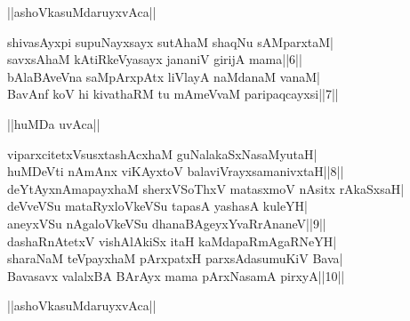 \documentclass{article}
\begin{document}
\begin{center}
||ashoVkasuMdaruyxvAca||
\end{center}

shivasAyxpi supuNayxsayx sutAhaM shaqNu sAMparxtaM|\\
savxsAhaM kAtiRkeVyasayx jananiV girijA mama||6||\\
bAlaBAveVna saMpArxpAtx liVlayA naMdanaM vanaM|\\
BavAnf koV hi kivathaRM tu mAmeVvaM paripaqcayxsi||7||\\

\begin{center}
||huMDa uvAca||
\end{center}

viparxcitetxVsusxtashAcxhaM guNalakaSxNasaMyutaH|\\
huMDeVti nAmAnx viKAyxtoV balaviVrayxsamanivxtaH||8||\\
deYtAyxnAmapayxhaM sherxVSoThxV matasxmoV nAsitx rAkaSxsaH|\\
deVveVSu mataRyxloVkeVSu tapasA yashasA kuleYH|\\
aneyxVSu nAgaloVkeVSu dhanaBAgeyxYvaRrAnaneV||9||\\
dashaRnAtetxV vishAlAkiSx itaH kaMdapaRmAgaRNeYH|\\
sharaNaM teVpayxhaM pArxpatxH parxsAdasumuKiV Bava|\\
Bavasavx valalxBA BArAyx mama pArxNasamA pirxyA||10||\\

\begin{center}
||ashoVkasuMdaruyxvAca||
\end{center}
\end{document}
